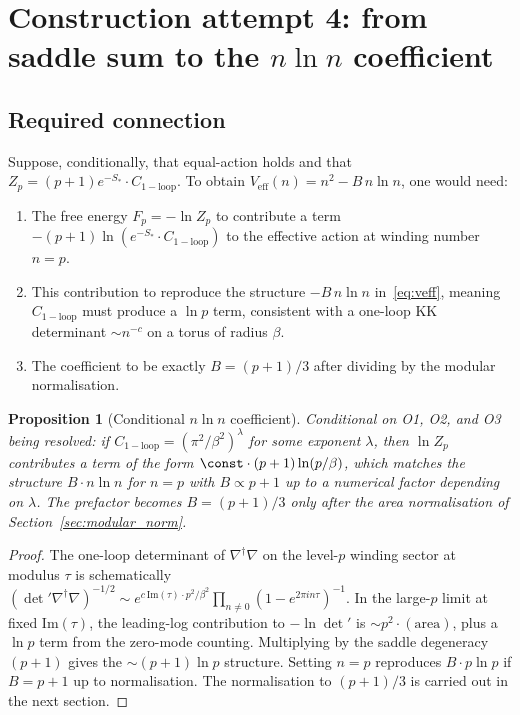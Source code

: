 \documentclass[12pt,a4paper]{article}
\newtheorem{proposition}[theorem]{Proposition}
\theoremstyle{definition}
\theoremstyle{remark}
\newcommand{\Zp}{Z_p}
\begin{document}
\section{Construction attempt 4: from saddle sum to the $n\ln n$ coefficient}
\label{sec:nlogn}

\subsection{Required connection}

Suppose, conditionally, that equal-action holds and that
$\Zp = (p+1)e^{-S_*}\cdot C_{\mathrm{1-loop}}$.
To obtain $V_{\mathrm{eff}}(n)=n^2-B\,n\ln n$, one would need:

\begin{enumerate}
  \item The free energy $F_p = -\ln\Zp$ to contribute a term
        $-(p+1)\ln(e^{-S_*}\cdot C_{\mathrm{1-loop}})$ to the effective action
        at winding number $n=p$.
  \item This contribution to reproduce the structure $-B\,n\ln n$ in~\eqref{eq:veff},
        meaning $C_{\mathrm{1-loop}}$ must produce a $\ln p$ term, consistent
        with a one-loop KK determinant $\sim n^{-c}$ on a torus of radius $\beta$.
  \item The coefficient to be exactly $B=(p+1)/3$ after dividing by the modular
        normalisation.
\end{enumerate}

\begin{proposition}[Conditional $n\ln n$ coefficient]
\label{prop:nlogn}
Conditional on O1, O2, and O3 being resolved:
if $C_{\mathrm{1-loop}}=(\pi^2/\beta^2)^{\lambda}$ for some exponent $\lambda$,
then $\ln\Zp$ contributes a term of the form $\const\cdot(p+1)\ln(p/\beta)$,
which matches the structure $B\cdot n\ln n$ for $n=p$ with
$B\propto p+1$ up to a numerical factor depending on $\lambda$.
The prefactor becomes $B=(p+1)/3$ only after the area normalisation of
Section~\ref{sec:modular_norm}.
\end{proposition}

\begin{proof}
The one-loop determinant of $\nabla^\dagger\nabla$ on the level-$p$
winding sector at modulus $\tau$ is schematically
$(\det'\nabla^\dagger\nabla)^{-1/2}\sim e^{c\,\mathrm{Im}(\tau)\cdot p^2/\beta^2}
 \prod_{n\neq 0}(1-e^{2\pi i n\tau})^{-1}$.
In the large-$p$ limit at fixed $\mathrm{Im}(\tau)$, the leading-log
contribution to $-\ln\det'$ is $\sim p^2\cdot(\text{area})$, plus a
$\ln p$ term from the zero-mode counting.  Multiplying by the saddle
degeneracy $(p+1)$ gives the $\sim(p+1)\ln p$ structure.  Setting
$n=p$ reproduces $B\cdot p\ln p$ if $B=p+1$ up to normalisation.  The
normalisation to $(p+1)/3$ is carried out in the next section.
\end{proof}
\end{document}
